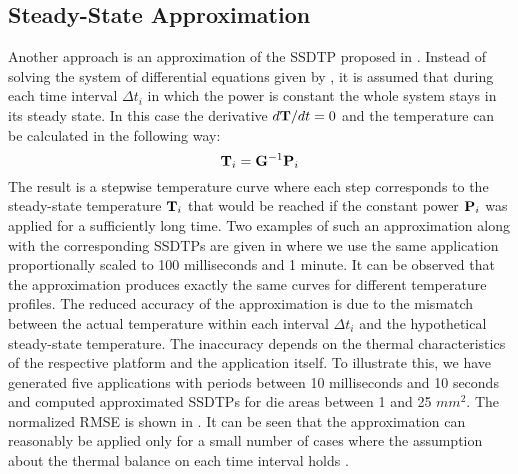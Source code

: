 \subsection{Steady-State Approximation}
Another approach is an approximation of the SSDTP proposed in \cite{huang2009}. Instead of solving the system of differential equations given by , it is assumed that during each time interval $\Delta t_i$ in which the power is constant the whole system stays in its steady state. In this case the derivative \mbox{$d\mathbf{T}/dt = 0$} and the temperature can be calculated in the following way:
\[
  \mathbf{T}_i = \mathbf{G}^{-1} \mathbf{P}_i
\]
The result is a stepwise temperature curve where each step corresponds to the steady-state temperature $\mathbf{T}_i$ that would be reached if the constant power $\mathbf{P}_i$ was applied for a sufficiently long time. Two examples of such an approximation along with the corresponding SSDTPs are given in  where we use the same application proportionally scaled to 100 milliseconds and 1 minute. It can be observed that the approximation produces exactly the same curves for different temperature profiles. The reduced accuracy of the approximation is due to the mismatch between the actual temperature within each interval $\Delta t_i$ and the hypothetical steady-state temperature. The inaccuracy depends on the thermal characteristics of the respective platform and the application itself. To illustrate this, we have generated five applications with periods between 10 milliseconds and 10 seconds and computed approximated SSDTPs for die areas between 1 and 25 $mm^2$. The normalized RMSE is shown in . It can be seen that the approximation can reasonably be applied only for a small number of cases where the assumption about the thermal balance on each time interval holds \cite{huang2009}.
